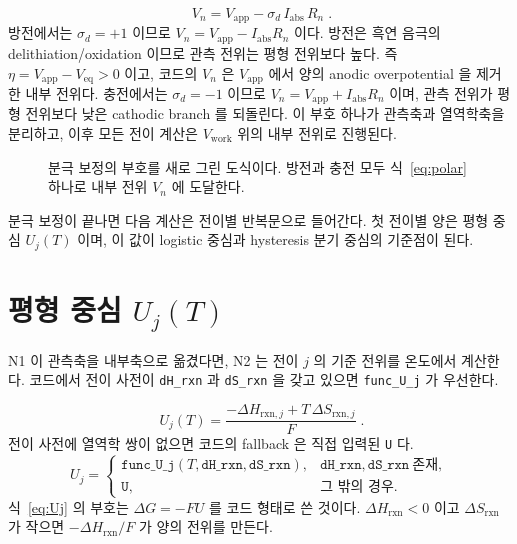 \documentclass[11pt,a4paper]{article}
\newcommand{\app}{\mathrm{app}}
\newcommand{\eq}{\mathrm{eq}}
\newcommand{\work}{\mathrm{work}}
\newcommand{\abs}{\mathrm{abs}}
\begin{document}
\begin{equation}
\boxed{\;V_n=V_{\app}-\sigma_d\,I_{\abs}\,R_n\;.}
\label{eq:polar}
\end{equation}
방전에서는 $\sigma_d=+1$ 이므로 $V_n=V_{\app}-I_{\abs}R_n$ 이다. 방전은 흑연 음극의 delithiation/oxidation 이므로 관측 전위는 평형 전위보다 높다. 즉 $\eta=V_{\app}-V_{\eq}>0$ 이고, 코드의 $V_n$ 은 $V_{\app}$ 에서 양의 anodic overpotential 을 제거한 내부 전위다. 충전에서는 $\sigma_d=-1$ 이므로 $V_n=V_{\app}+I_{\abs}R_n$ 이며, 관측 전위가 평형 전위보다 낮은 cathodic branch 를 되돌린다. 이 부호 하나가 관측축과 열역학축을 분리하고, 이후 모든 전이 계산은 $V_{\work}$ 위의 내부 전위로 진행된다.

\begin{figure}[t]
\centering
{}
\caption{분극 보정의 부호를 새로 그린 도식이다. 방전과 충전 모두 식~\eqref{eq:polar} 하나로 내부 전위 $V_n$ 에 도달한다.}
\label{fig:polar}
\end{figure}

분극 보정이 끝나면 다음 계산은 전이별 반복문으로 들어간다. 첫 전이별 양은 평형 중심 $U_j(T)$ 이며, 이 값이 logistic 중심과 hysteresis 분기 중심의 기준점이 된다.

\section{평형 중심 $U_j(T)$}\label{sec:n2}
N1 이 관측축을 내부축으로 옮겼다면, N2 는 전이 $j$ 의 기준 전위를 온도에서 계산한다. 코드에서 전이 사전이 \texttt{dH\_rxn} 과 \texttt{dS\_rxn} 을 갖고 있으면 \texttt{func\_U\_j} 가 우선한다.

\begin{equation}
\boxed{\;U_j(T)=\frac{-\Delta H_{\mathrm{rxn},j}+T\,\Delta S_{\mathrm{rxn},j}}{F}\;.}
\label{eq:Uj}
\end{equation}
전이 사전에 열역학 쌍이 없으면 코드의 fallback 은 직접 입력된 \texttt{U} 다.
\begin{equation}
U_j=
\begin{cases}
\texttt{func\_U\_j}(T,\texttt{dH\_rxn},\texttt{dS\_rxn}),& \texttt{dH\_rxn},\texttt{dS\_rxn}\ \text{존재},\\
\texttt{U},&\text{그 밖의 경우}.
\end{cases}
\label{eq:Udispatch}
\end{equation}
식~\eqref{eq:Uj} 의 부호는 $\Delta G=-FU$ 를 코드 형태로 쓴 것이다. $\Delta H_{\mathrm{rxn}}<0$ 이고 $\Delta S_{\mathrm{rxn}}$ 가 작으면 $-\Delta H_{\mathrm{rxn}}/F$ 가 양의 전위를 만든다.
\end{document}
